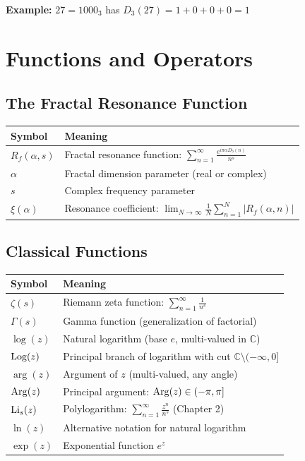 \textbf{Example:} $27 = 1000_3$ has $D_3(27) = 1 + 0 + 0 + 0 = 1$

\section*{Functions and Operators}

\subsection*{The Fractal Resonance Function}

\begin{center}
\begin{tabular}{ll}
\toprule
\textbf{Symbol} & \textbf{Meaning} \\
\midrule
$R_f(\alpha, s)$ & Fractal resonance function: $\sum_{n=1}^{\infty} \frac{e^{i\pi\alpha D_3(n)}}{n^s}$ \\
$\alpha$ & Fractal dimension parameter (real or complex) \\
$s$ & Complex frequency parameter \\
$\xi(\alpha)$ & Resonance coefficient: $\lim_{N \to \infty} \frac{1}{N}\sum_{n=1}^{N} |R_f(\alpha, n)|$ \\
\bottomrule
\end{tabular}
\end{center}

\subsection*{Classical Functions}

\begin{center}
\begin{tabular}{ll}
\toprule
\textbf{Symbol} & \textbf{Meaning} \\
\midrule
$\zeta(s)$ & Riemann zeta function: $\sum_{n=1}^{\infty} \frac{1}{n^s}$ \\
$\Gamma(s)$ & Gamma function (generalization of factorial) \\
$\log(z)$ & Natural logarithm (base $e$, multi-valued in $\mathbb{C}$) \\
$\operatorname{Log}(z)$ & Principal branch of logarithm with cut $\mathbb{C} \setminus (-\infty, 0]$ \\
$\arg(z)$ & Argument of $z$ (multi-valued, any angle) \\
$\operatorname{Arg}(z)$ & Principal argument: $\operatorname{Arg}(z) \in (-\pi, \pi]$ \\
$\operatorname{Li}_s(z)$ & Polylogarithm: $\sum_{n=1}^{\infty} \frac{z^n}{n^s}$ (Chapter 2) \\
$\ln(z)$ & Alternative notation for natural logarithm \\
$\exp(z)$ & Exponential function $e^z$ \\
\bottomrule
\end{tabular}
\end{center}

